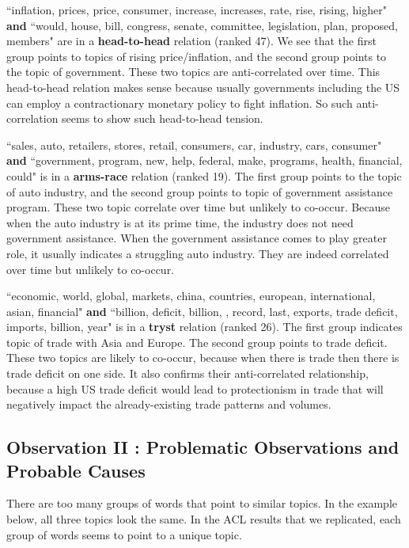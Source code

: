 \documentclass[11pt,a4paper]{article}
\newcommand\boldhead[1]{\textcolor{red-brown}{\textbf{#1}}}
\newcommand\boldtryst[1]{\textcolor{pinksherbet}{\textbf{#1}}}
\newcommand\boldarms[1]{\textcolor{blue(ncs)}{\textbf{#1}}}
\begin{document}
\item ``inflation, prices, price, consumer, increase, increases, rate, rise, rising, higher"
\textbf{and} 
``would, house, bill, congress, senate, committee, legislation, plan, proposed, members" are in a
\boldhead{head-to-head} relation (ranked 47). We see that the first group points to topics of rising price/inflation, and the second group points to the topic of government. These two topics are anti-correlated over time. This head-to-head relation makes sense because usually governments including the US can employ a contractionary monetary policy to fight inflation. So such anti-correlation seems to show such head-to-head tension.  

``sales, auto, retailers, stores, retail, consumers, car, industry, cars, consumer" 
\textbf{and}
``government, program, new, help, federal, make, programs, health, financial, could" is in a \boldarms{arms-race} relation (ranked 19). The first group points to the topic of auto industry, and the second group points to topic of government assistance program. These two topic correlate over time but unlikely to co-occur. Because when the auto industry is at its prime time, the industry does not need government assistance. When the government assistance comes to play greater role, it usually indicates a struggling auto industry. They are indeed correlated over time but unlikely to co-occur. 

``economic, world, global, markets, china, countries, european, international, asian, financial"
\textbf{and} 
``billion, deficit, billion, , record, last, exports, trade deficit, imports, billion, year" is in a \boldtryst{tryst} relation (ranked 26). The first group indicates topic of trade with Asia and Europe. The second group points to trade deficit. These two topics are likely to co-occur, because when there is trade then there is trade deficit on one side. It also confirms their anti-correlated relationship, because a high US trade deficit would lead to protectionism in trade that will negatively impact the already-existing trade patterns and volumes. 




\subsection{Observation II : Problematic Observations and Probable Causes} 
There are too many groups of words that point to similar topics. In the example below, all three topics look the same. In the ACL results that we replicated, each group of words seems to point to a unique topic. 
\end{document}
